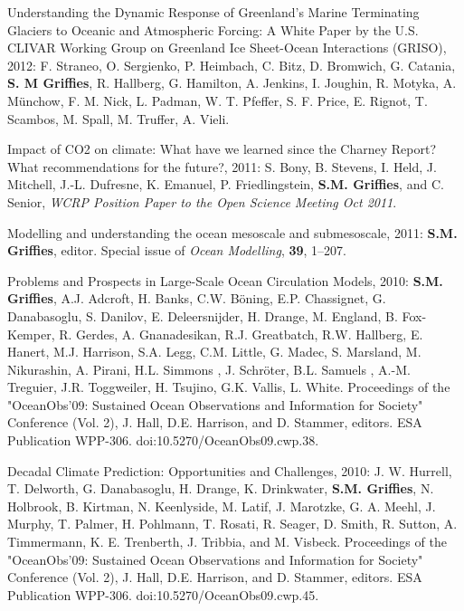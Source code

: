 \begin{etaremune}
\item Understanding the Dynamic Response of Greenland’s Marine
  Terminating Glaciers to Oceanic and Atmospheric Forcing: A White
  Paper by the U.S. CLIVAR Working Group on Greenland Ice Sheet-Ocean
  Interactions (GRISO), 2012: F. Straneo, O. Sergienko, P. Heimbach,
  C. Bitz, D. Bromwich, G. Catania, {\bf S. M Grif\/f\/ies}, R.
  Hallberg, G. Hamilton, A. Jenkins, I. Joughin, R. Motyka,
  A. Münchow, F. M. Nick, L. Padman, W. T. Pfeffer, S. F. Price,
  E. Rignot, T. Scambos, M. Spall, M. Truffer, A. Vieli.

\item Impact of CO2 on climate: What have we learned since the Charney
  Report?  What recommendations for the future?, 2011: S. Bony,
  B. Stevens, I. Held, J. Mitchell, J.-L. Dufresne, K. Emanuel,
  P. Friedlingstein, {\bf S.M. Grif\/f\/ies}, and C. Senior, {\it WCRP
    Position Paper to the Open Science Meeting Oct 2011}.

\item Modelling and understanding the ocean mesoscale and
  submesoscale, 2011: {\bf S.M. Griffies}, editor. Special issue of
  {\it Ocean Modelling}, {\bf 39}, 1--207.

\item Problems and Prospects in Large-Scale Ocean Circulation Models,
  2010: {\bf S.M. Griffies}, A.J. Adcroft, H. Banks, C.W. B\"oning,
 E.P. Chassignet, G. Danabasoglu, S.  Danilov, E. Deleersnijder,
  H. Drange, M. England, B. Fox-Kemper, R. Gerdes, A.  Gnanadesikan,
  R.J. Greatbatch, R.W. Hallberg, E. Hanert, M.J. Harrison, S.A. Legg,
  C.M.  Little, G. Madec, S. Marsland, M. Nikurashin, A. Pirani,
  H.L. Simmons , J. Schr\"oter, B.L.  Samuels , A.-M. Treguier,
  J.R. Toggweiler, H. Tsujino, G.K. Vallis, L. White.  Proceedings of
  the "OceanObs’09: Sustained Ocean Observations and Information for
  Society" Conference (Vol. 2), J. Hall, D.E. Harrison, and
  D. Stammer, editors. ESA Publication WPP-306.
  doi:10.5270/OceanObs09.cwp.38.

\item Decadal Climate Prediction: Opportunities and Challenges, 2010:
  J. W. Hurrell, T. Delworth, G. Danabasoglu, H. Drange,
  K. Drinkwater, {\bf S.M. Griffies}, N. Holbrook, B. Kirtman,
  N. Keenlyside, M. Latif, J. Marotzke, G. A. Meehl, J. Murphy,
  T. Palmer, H. Pohlmann, T. Rosati, R. Seager, D. Smith, R. Sutton,
  A. Timmermann, K. E. Trenberth, J. Tribbia, and M. Visbeck.
  Proceedings of the "OceanObs’09: Sustained Ocean Observations and
  Information for Society" Conference (Vol. 2), J. Hall,
  D.E. Harrison, and D. Stammer, editors. ESA Publication WPP-306.
  doi:10.5270/OceanObs09.cwp.45.


\end{etaremune}
